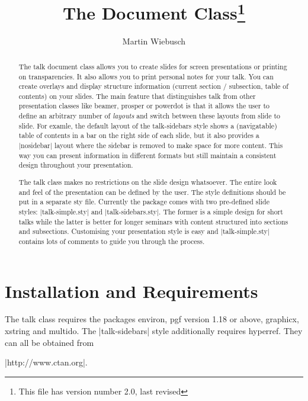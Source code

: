 \documentclass[12pt]{ltxdoc}
\title{The \pkg{talk} Document Class\thanks{This file has version number 2.0,
    last revised \lastupdated}}
\author{Martin Wiebusch}
\newcommand{\pkg}[1]{\textsf{#1}}
\renewenvironment{quote}{\list{}{\leftmargin\parindent}\item[]}{\endlist}
\begin{document}
\maketitle
\begin{abstract}
  The \pkg{talk} document class allows you to create slides for screen
  presentations or printing on transparencies. It also allows you to print
  personal notes for your talk. You can create overlays and display structure
  information (current section / subsection, table of contents) on your slides.
  The main feature that distinguishes \pkg{talk} from other presentation
  classes like \pkg{beamer}, \pkg{prosper} or \pkg{powerdot} is that it allows
  the user to define an arbitrary number of \emph{layouts} and switch between
  these layouts from slide to slide. For examle, the default layout of the
  \pkg{talk-sidebars} style shows a (navigatable) table of contents in a bar on
  the right side of each slide, but it also provides a |nosidebar| layout
  where the sidebar is removed to make space for more content. This way you can
  present information in different formats but still maintain a consistent
  design throughout your presentation.

  The \pkg{talk} class makes no restrictions on the slide design whatsoever.
  The entire look and feel of the presentation can be defined by the user. The
  style definitions should be put in a separate sty file. Currently the package
  comes with two pre-defined slide styles: |talk-simple.sty| and
  |talk-sidebars.sty|. The former is a simple design for short talks while
  the latter is better for longer seminars with content structured into
  sections and subsections. Customising your presentation style is easy and
  |talk-simple.sty| contains lots of comments to guide you through the
  process.
\end{abstract}
\newpage
\tableofcontents
%
%
%
\section{Installation and Requirements}
%
%
The \pkg{talk} class requires the packages \pkg{environ}, \pkg{pgf} version
1.18 or above, \pkg{graphicx}, \pkg{xstring} and \pkg{multido}. The
|talk-sidebars| style additionally requires \pkg{hyperref}. They can all be
obtained from
\begin{quote}
  |http://www.ctan.org|.
\end{quote}
\end{document}
